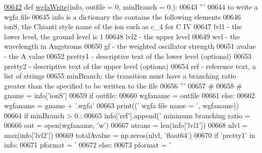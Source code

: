 \begin{DoxyCode}
\hypertarget{namespacepyneb_1_1utils_1_1__chianti__tools_l00642}{}\hyperlink{namespacepyneb_1_1utils_1_1__chianti__tools_a300c13ee6815450bc20d25a2c6dcb8a8}{00642} \textcolor{keyword}{def }\hyperlink{namespacepyneb_1_1utils_1_1__chianti__tools_a300c13ee6815450bc20d25a2c6dcb8a8}{wgfaWrite}(info, outfile = 0, minBranch = 0.):
00643     \textcolor{stringliteral}{'''}
00644 \textcolor{stringliteral}{    to write a wgfa file}
00645 \textcolor{stringliteral}{    info is a dictionary the contains the following elements}
00646 \textcolor{stringliteral}{    ionS, the Chianti style name of the ion such as c\_4 for C IV}
00647 \textcolor{stringliteral}{    lvl1 - the lower level, the ground level is 1}
00648 \textcolor{stringliteral}{    lvl2 - the upper level}
00649 \textcolor{stringliteral}{    wvl - the wavelength in Angstroms}
00650 \textcolor{stringliteral}{    gf - the weighted oscillator strength}
00651 \textcolor{stringliteral}{    avalue - the A value}
00652 \textcolor{stringliteral}{    pretty1 - descriptive text of the lower level (optional)}
00653 \textcolor{stringliteral}{    pretty2 - descriptive text of the upper level (optiona)}
00654 \textcolor{stringliteral}{    ref - reference text, a list of strings}
00655 \textcolor{stringliteral}{    minBranch:  the transition must have a branching ratio greater than the specified to be written to the
       file}
00656 \textcolor{stringliteral}{    '''}
00657     \textcolor{comment}{#}
00658 \textcolor{comment}{#    gname = info['ionS']}
00659     \textcolor{keywordflow}{if} outfile:
00660         wgfaname = outfile
00661     \textcolor{keywordflow}{else}:
00662         wgfaname = gname + \textcolor{stringliteral}{'.wgfa'}
00663     print((\textcolor{stringliteral}{' wgfa file name = '}, wgfaname))
00664     \textcolor{keywordflow}{if} minBranch > 0.:
00665         info[\textcolor{stringliteral}{'ref'}].append(\textcolor{stringliteral}{' minimum branching ratio = %
00666     out = open(wgfaname, \textcolor{stringliteral}{'w'})
00667     ntrans = len(info[\textcolor{stringliteral}{'lvl1'}])
00668     nlvl = max(info[\textcolor{stringliteral}{'lvl2'}])
00669     totalAvalue = np.zeros(nlvl, \textcolor{stringliteral}{'float64'})
00670     \textcolor{keywordflow}{if} \textcolor{stringliteral}{'pretty1'} \textcolor{keywordflow}{in} info:
00671         pformat = \textcolor{stringliteral}{'%
00672     \textcolor{keywordflow}{else}:
00673         pformat = \textcolor{stringliteral}{'%
}}}
\end{DoxyCode}
